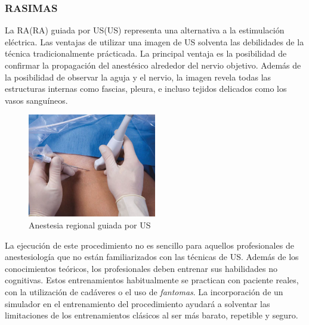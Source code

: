 \subsubsection{RASIMAS}
\label{art:rasimas}


La \acl{RA}(\acs{RA}) guiada por \acl{US}(\acs{US}) representa una alternativa a la estimulación eléctrica. Las ventajas de utilizar una imagen de \ac{US} solventa las debilidades de la técnica tradicionalmente prácticada. La principal ventaja es la posibilidad de confirmar la propagación del anestésico alrededor del nervio objetivo. Además de la posibilidad de observar la aguja y el nervio, la imagen revela todas las estructuras internas como fascias, pleura, e incluso tejidos delicados como los vasos sanguíneos. 

\begin{figure}[h]
   \centering
    \includegraphics[width=0.5\textwidth]{IMG/RAUS.png}
    \caption{ Anestesia regional guiada por \acl{US}}
   \label{fig:raus}
\end{figure}

La ejecución de este procedimiento no es sencillo para aquellos profesionales de anestesiología que no están familiarizados con las técnicas de \ac{US}. Además de los conocimientos teóricos, los profesionales deben entrenar sus habilidades no cognitivas. Estos entrenamientos habitualmente se practican con paciente reales, con la utilización de cadáveres\cite{Tsui2007} o el uso de \emph{fantomas}\cite{phantomra}. La incorporación de un simulador en el entrenamiento del procedimiento ayudará a solventar las limitaciones de los entrenamientos clásicos al ser más barato, repetible y seguro.

